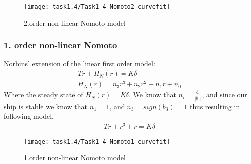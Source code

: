 \begin{figure}[H]
    \centering
    \texttt{[image: task1.4/Task1\_4\_Nomoto2\_curvefit]}
    \caption{2.order non-linear Nomoto model}
    \label{fig:nomoto2_nonlin}
\end{figure}


\newpage
\subsubsection*{1. order non-linear Nomoto}
Norbins' extension of the linear first order model:
\begin{equation}
\begin{split}
	T\dot{r}+H_N(r)=K\delta \\
	H_N(r) = n_3r^3 + n_2r^2 + n_1r + n_0
\end{split}
\end{equation}
Where the steady state of $H_N(r)=K\delta$. We know that $n_i = \frac{b_i}{|b_1|}$, and since our ship is stable we know that $n_1=1$, and $n_3 = sign(b_3)=1$ thus resulting in following model.
\begin{equation}
\begin{split}
	T\dot{r}+r^3 + r=K\delta 
\end{split}
\end{equation}

\begin{figure}[H]
    \centering
    \texttt{[image: task1.4/Task1\_4\_Nomoto1\_curvefit]}
    \caption{1.order non-linear Nomoto model}
    \label{fig:nomoto1_nonlin}
\end{figure}
